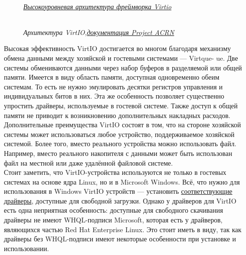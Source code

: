 \documentclass[14pt, a4paper]{article}
\begin{document}
\newpage
\begin{figure}[h]
    \centering
    \\ 
    \href{https://developer.ibm.com/articles/l-virtio/}{\small\textit{Высокоуровневая архитектура фреймворка Virtio}} 
    \label{framework} 
\end{figure}

\begin{figure}[h]
    \centering
    \\ 
    \small\textit{Архитектура VirtIO,}\href{https://projectacrn.github.io/latest/developer-guides/hld/hld-virtio-devices.html#architecture}{\small\textit{документация Project ACRN}} 
    \label{framework} 
\end{figure}

Высокая эффективность VirtIO достигается во многом благодаря механизму обмена данными между
хозяйской и гостевыми системами — Virtque- ue. Две системы обмениваются данными через набор
буферов в разделяемой или общей памяти. Имеется в виду область памяти, доступная одновременно
обеим системам. То есть не нужно эмулировать десятки регистров управления и индивидуальных
битов в них. Эта же особенность позволяет существенно упростить драйверы, используемые в
гостевой системе. Также доступ к общей памяти не приводит к возникновению дополнительных
накладных расходов.\\

Дополнительные преимущества VirtIO состоят в том, что на стороне хозяйской системы может
использоваться любое устройство, поддерживаемое хозяйской системой. Более того, вместо
реального устройства можно использовать файл. Например, вместо реального накопителя с данными
может быть использован файл на местной или даже удалённой файловой системе.\\

Стоит заметить, что VirtIO-устройства используются не только в гостевых системах на основе ядра
Linux, но и в Microsoft Windows. Всё, что нужно для использования в Windows VirtIO устройств —
установить \href{http://www.linux-kvm.org/page/WindowsGuestDrivers}{соответствующие драйверы}, доступные для свободной загрузки. Однако у драйверов для
VirtIO есть одна неприятная особенность: доступные для свободного скачивания драйверы не имеют
WHQL-подписи Microsoft, которая есть у драйверов, являющихся частью Red Hat Enterprise Linux. Это
стоит иметь в виду, так как драйверы без WHQL-подписи имеют некоторые особенности при установке
и использовании.\\
\end{document}
